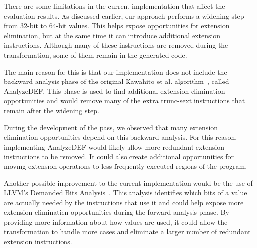 There are some limitations in the current implementation that affect the evaluation results. As discussed earlier, our approach performs a widening step from 32-bit to 64-bit values. This helps expose opportunities for extension elimination, but at the same time it can introduce additional extension instructions. Although many of these instructions are removed during the transformation, some of them remain in the generated code.

The main reason for this is that our implementation does not include the backward analysis phase of the original Kawahito et al. algorithm~\cite{kawahito2002effective}, called AnalyzeDEF. This phase is used to find additional extension elimination opportunities and would remove many of the extra trunc-sext instructions that remain after the widening step.

During the development of the pass, we observed that many extension elimination opportunities depend on this backward analysis. For this reason, implementing AnalyzeDEF would likely allow more redundant extension instructions to be removed. It could also create additional opportunities for moving extension operations to less frequently executed regions of the program.

Another possible improvement to the current implementation would be the use of LLVM's Demanded Bits Analysis~\cite{llvm-demandedbits}. This analysis identifies which bits of a value are actually needed by the instructions that use it and could help expose more extension elimination opportunities during the forward analysis phase. By providing more information about how values are used, it could allow the transformation to handle more cases and eliminate a larger number of redundant extension instructions.
